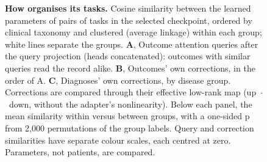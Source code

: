 
\begin{figure}[p]
  \caption{\textbf{How \opera{} organises its tasks.} Cosine similarity between
  the learned parameters of pairs of tasks in the selected checkpoint, ordered
  by clinical taxonomy and clustered (average linkage) within each group; white
  lines separate the groups. \textbf{A}, Outcome attention queries after the
  query projection (heads concatenated): outcomes with similar queries read the
  record alike. \textbf{B}, Outcomes' own corrections, in the order of A.
  \textbf{C}, Diagnoses' own corrections, by disease group. Corrections are compared
  through their effective low-rank map (up~$\cdot$~down, without the adapter's
  nonlinearity). Below each panel, the mean similarity within versus between
  groups, with a one-sided p from 2,000 permutations of the group labels. Query
  and correction similarities have separate colour scales, each centred at
  zero. Parameters, not patients, are compared.}
  \label{fig:task-organisation}
\end{figure}

